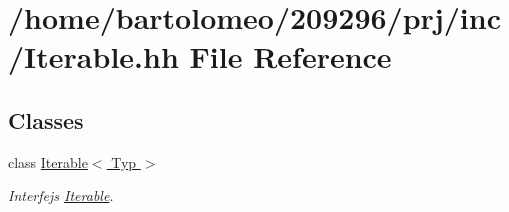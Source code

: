 \hypertarget{_iterable_8hh}{\section{/home/bartolomeo/209296/prj/inc/\-Iterable.hh File Reference}
\label{_iterable_8hh}
}
\subsection*{Classes}
\begin{DoxyCompactItemize}
\item 
class \hyperlink{class_iterable}{Iterable$<$ Typ $>$}
\begin{DoxyCompactList}\small\item\em Interfejs \hyperlink{class_iterable}{Iterable}. \end{DoxyCompactList}\end{DoxyCompactItemize}
